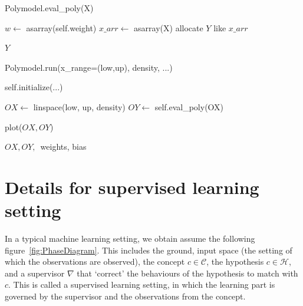 \documentclass[10pt]{article}
\begin{document}
\begin{algorithm}[H]
\caption{\textsf{Polymodel.eval\_poly}(X)}



$w \leftarrow$ asarray(self.weight)\;
$x\_arr \leftarrow$ asarray(X)\;
allocate $Y$ like $x\_arr$\;


\Return $Y$\;

\end{algorithm}


\begin{algorithm}[H]
\caption{\textsf{Polymodel.run}(x\_range=(low,up), density, ...)}



self.initialize(...)\;

$OX \leftarrow$ linspace(low, up, density)\;
$OY \leftarrow$ self.eval\_poly(OX)\;

plot($OX, OY$)\;


\Return $OX, OY, \,$ weights, bias\;

\end{algorithm}

\section{Details for supervised learning setting}

In a typical machine learning setting, we obtain assume the following figure~\ref{fig:PhaseDiagram}. This includes the ground, input space (the setting of which the observations are observed), the concept $c\in\mathcal{C}$, the hypothesis $c\in \mathcal{H}$, and a supervisor $\nabla$ that `correct' the behaviours of the hypothesis to match with $c$. This is called a supervised learning setting, in which the learning part is governed by the supervisor and the observations from the concept.
\end{document}
